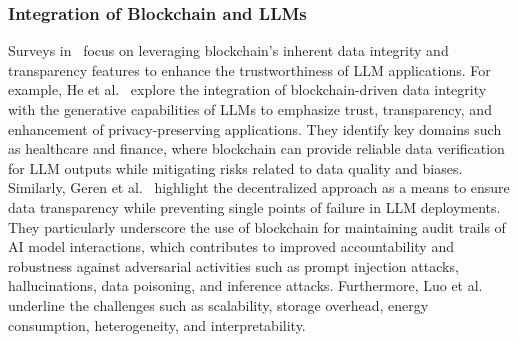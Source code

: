 \documentclass[5p,twocolumn]{elsarticle}
\begin{document}
\subsubsection{Integration of Blockchain and LLMs}
Surveys in~\cite{he2024large, geren2025blockchain, luo2024bc4llm} focus on leveraging blockchain's inherent data integrity and transparency features to enhance the trustworthiness of LLM applications. For example, He et al.~\cite{he2024large} explore the integration of blockchain-driven data integrity with the generative capabilities of LLMs to emphasize trust, transparency, and enhancement of privacy-preserving applications. They identify key domains such as healthcare and finance, where blockchain can provide reliable data verification for LLM outputs while mitigating risks related to data quality and biases. Similarly, Geren et al.~\cite{geren2025blockchain} highlight the decentralized approach as a means to ensure data transparency while preventing single points of failure in LLM deployments. They particularly underscore the use of blockchain for maintaining audit trails of AI model interactions, which contributes to improved accountability and robustness against adversarial activities such as prompt injection attacks, hallucinations, data poisoning, and inference attacks. Furthermore, Luo et al.~\cite{luo2024bc4llm} underline the challenges such as scalability, storage overhead, energy consumption, heterogeneity, and interpretability.
\end{document}
